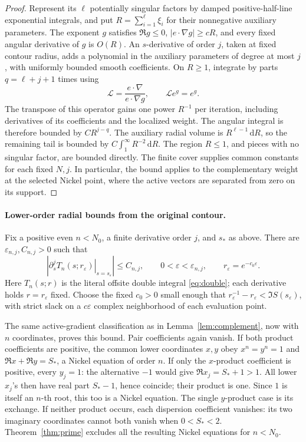 \documentclass[11pt]{article}
\numberwithin{equation}{section}
\theoremstyle{definition}
\newcommand{\dd}{\,\mathrm d}
\newcommand{\eps}{\varepsilon}
\begin{document}
\begin{proof}
Represent its \(\ell\) potentially singular factors by damped
positive-half-line exponential integrals, and put
\(R=\sum_{i=1}^{\ell}\xi_i\) for their nonnegative auxiliary
parameters. The exponent \(g\) satisfies \(\Re g\le0\),
\(|e\cdot\nabla g|\ge cR\), and every fixed angular derivative
of \(g\) is \(O(R)\). An \(s\)-derivative of order \(j\), taken
at fixed contour radius, adds a polynomial in the auxiliary parameters
of degree at most \(j\), with uniformly bounded smooth coefficients.
On \(R\ge1\), integrate by parts \(q=\ell+j+1\) times using
\[
 \mathcal L=\frac{e\cdot\nabla}{e\cdot\nabla g},
 \qquad \mathcal L e^g=e^g.
\]
The transpose of this operator gains one power \(R^{-1}\) per
iteration, including derivatives of its coefficients and the localized
weight. The angular integral is therefore bounded by \(CR^{j-q}\).
The auxiliary radial volume is \(R^{\ell-1}\dd R\), so the
remaining tail is bounded by \(C\int_1^\infty R^{-2}\dd R\).
The region \(R\le1\), and pieces with no singular factor, are bounded
directly. The finite cover supplies common constants for each fixed
\(N,j\). In particular, the bound applies to the complementary weight
at the selected Nickel point, where the active vectors are separated
from zero on its support.
\end{proof}

\paragraph{Lower-order radial bounds from the original contour.}
Fix a positive even \(n<N_0\), a finite derivative order \(j\), and
\(s_*\) as above. There are \(\eps_{n,j},C_{n,j}>0\) such that
\[
 \left|\left.\partial_s^j T_n(s;r_\eps)\right|_{s=s_\eps}\right|
 \le C_{n,j},\qquad 0<\eps<\eps_{n,j},\qquad
 r_\eps=e^{-c_0\eps}.
\]
Here \(T_n(s;r)\) is the literal offsite double integral
\eqref{eq:double}; each derivative holds \(r=r_\eps\) fixed.
Choose the fixed \(c_0>0\) small enough that
\(r_\eps^{-1}-r_\eps<\Im S(s_\eps)\), with strict slack on a
\(c\eps\) complex neighborhood of each evaluation point.

The same active-gradient classification as in
Lemma~\ref{lem:complement}, now with \(n\) coordinates, proves this bound. Pair coefficients
again vanish. If both product coefficients are positive, the common
lower coordinates \(x,y\) obey \(x^n=y^n=1\) and
\(\Re x+\Re y=S_*\), a Nickel equation of order \(n\).
If only the \(x\)-product coefficient is positive, every \(y_j=1\):
the alternative \(-1\) would give \(\Re x_j=S_*+1>1\).
All lower \(x_j\)'s then have real part \(S_*-1\), hence coincide;
their product is one. Since \(1\) is itself an \(n\)-th root,
this too is a Nickel equation. The single \(y\)-product case is its
exchange. If neither product occurs, each dispersion coefficient
vanishes: its two imaginary coordinates cannot both vanish when
\(0<S_*<2\). Theorem~\ref{thm:prime} excludes all the resulting
Nickel equations for \(n<N_0\).
\end{document}
